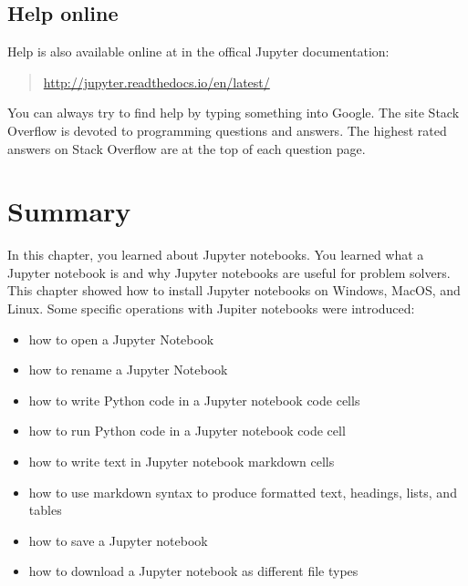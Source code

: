 \documentclass{book}
\providecommand{\tightlist}{%
      \setlength{\itemsep}{0pt}\setlength{\parskip}{0pt}}
\begin{document}
    
        \hypertarget{help-online}{%
\subsection{Help online}\label{help-online}}

Help is also available online at in the offical Jupyter documentation:

\begin{quote}
\url{http://jupyter.readthedocs.io/en/latest/}
\end{quote}

You can always try to find help by typing something into Google. The
site Stack Overflow is devoted to programming questions and answers. The
highest rated answers on Stack Overflow are at the top of each question
page.
    




    
        \newpage
        \hypertarget{summary}{%
\section{Summary}\label{summary}}

    




    
        In this chapter, you learned about Jupyter notebooks. You learned what a
Jupyter notebook is and why Jupyter notebooks are useful for problem
solvers. This chapter showed how to install Jupyter notebooks on
Windows, MacOS, and Linux. Some specific operations with Jupiter
notebooks were introduced:

\begin{itemize}
\tightlist
\item
  how to open a Jupyter Notebook
\item
  how to rename a Jupyter Notebook
\item
  how to write Python code in a Jupyter notebook code cells
\item
  how to run Python code in a Jupyter notebook code cell
\item
  how to write text in Jupyter notebook markdown cells
\item
  how to use markdown syntax to produce formatted text, headings, lists,
  and tables
\item
  how to save a Jupyter notebook
\item
  how to download a Jupyter notebook as different file types
\end{itemize}
\end{document}
